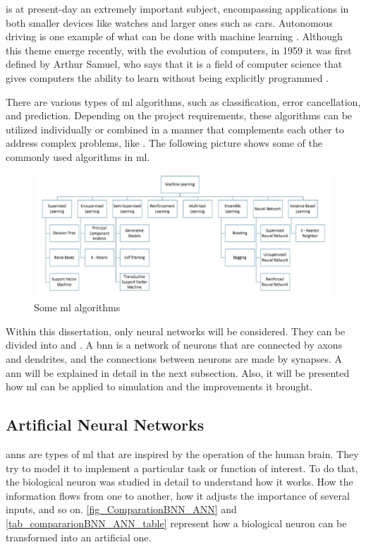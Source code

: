  is at present-day an extremely important subject, encompassing applications in both smaller devices like watches and larger ones such as cars.  Autonomous driving is one example of what can be done with machine learning \cite{bachute2021autonomous}. Although this theme emerge recently, with the evolution of computers, in 1959 it was first defined by Arthur Samuel, who says that it is a field of computer science that gives computers the ability to learn without being explicitly programmed \cite{samuel1959some}. 

There are various types of \gls{ml} algorithms, such as classification, error cancellation, and prediction. Depending on the project requirements, these algorithms can be utilized individually or combined in a manner that complements each other to address complex problems, like \cite{bachute2021autonomous}. The following picture shows some of the commonly used algorithms in \gls{ml}.

\begin{figure}[H]
	\centering
 	\includegraphics[width=0.9\linewidth]{Images/TypesOfML.png}
 	\caption{Some \gls{ml} algorithms \cite{mahesh2020machine}}
	 \label{fig_TypesOfML}
\end{figure}

Within this dissertation, only neural networks will be considered. They can be divided into  and . A \gls{bnn} is a network of neurons that are connected by axons and dendrites, and the connections between neurons are made by synapses. A \gls{ann} will be explained in detail in the next subsection. Also, it will be presented how \gls{ml} can be applied to simulation and the improvements it brought. 

\subsection{Artificial Neural Networks}

\glspl{ann} are types of \gls{ml} that are inspired by the operation of the human brain. They try to model it to implement a particular task or function of interest. To do that, the biological neuron was studied in detail to understand how it works. How the information flows from one to another, how it adjusts the importance of several inputs, and so on. \autoref{fig_ComparationBNN_ANN}  and \autoref{tab_compararionBNN_ANN_table} represent how a biological neuron can be transformed into an artificial one.

